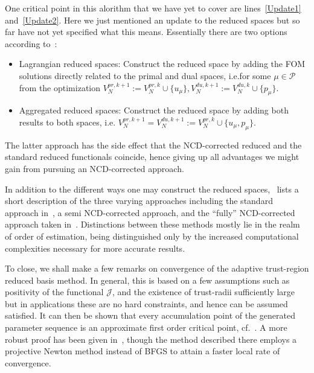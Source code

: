 One critical point in this alorithm that we have yet to cover are lines~\ref{Update1} and~\ref{Update2}.
Here we just mentioned an update to the reduced spaces but so far have not yet specified what this means.
Essentially there are two options according to~\cite{Keil2021}:
\begin{itemize}
    \item Lagrangian reduced spaces: Construct the reduced space by adding the FOM solutions directly related to the primal and dual spaces, i.e.\@ for some $\mu \in \mathcal{P}$ from the optimization $V_N^{pr, k + 1} := V_N^{pr, k} \cup \{ u_\mu \}, V_N^{du, k + 1} := V_N^{du, k} \cup \{ p_\mu \}$.
    \item Aggregated reduced spaces: Construct the reduced space by adding both results to both spaces, i.e. $V_N^{pr, k + 1} = V_N^{du, k + 1} := V_N^{pr, k} \cup \{ u_\mu, p_\mu \}$.
\end{itemize}
The latter approach has the side effect that the NCD-corrected reduced and the standard reduced functionals coincide, hence giving up all advantages we might gain from pursuing an NCD-corrected approach.

In addition to the different ways one may construct the reduced spaces,~\cite[Subsection 4.4]{Keil2021} lists a short description of the three varying approaches including the standard approach in~\cite{Qian2017}, a semi NCD-corrected approach, and the ``fully'' NCD-corrected approach taken in~\cite{Keil2021}.
Distinctions between these methods mostly lie in the realm of order of estimation, being distinguished only by the increased computational complexities necessary for more accurate results.

To close, we shall make a few remarks on convergence of the adaptive trust-region reduced basis method.
In general, this is based on a few assumptions such as positivity of the functional $\mathcal{J}$, and the existence of trust-radii sufficiently large but in applications these are no hard constraints, and hence can be assumed satisfied.
It can then be shown that every accumulation point of the generated parameter sequence is an approximate first order critical point, cf.~\cite[Theorem 4.5]{Keil2021}.
A more robust proof has been given in~\cite{Banholzer2020}, though the method described there employs a projective Newton method instead of BFGS to attain a faster local rate of convergence.

